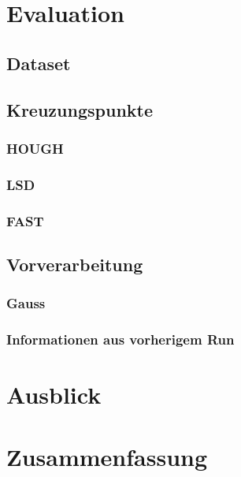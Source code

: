 
\chapter{Evaluation}
	\section{Dataset}
	\section{Kreuzungspunkte}
		\subsection{HOUGH}
		\subsection{LSD}
		\subsection{FAST}
	\section{Vorverarbeitung}
		\subsection{Gauss}
		\subsection{Informationen aus vorherigem Run}
\chapter{Ausblick}
\chapter{Zusammenfassung}
